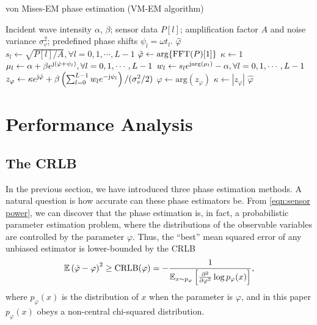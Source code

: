 \documentclass[12pt,draftclsnofoot,journal,onecolumn]{IEEEtran}
\theoremstyle{nonumberplain}
\def \arg {\text{arg}}
\begin{document}
    \begin{algorithm}[htbp] 
        \caption{von Mises-EM phase estimation (VM-EM algorithm)} \label{alg:VM-EM}
        \begin{algorithmic}[1]
            \REQUIRE Incident wave intensity $\alpha$, $\beta$; sensor data $P[l]$; amplification factor $A$ and noise variance $\sigma_v^2$; predefined phase shifts $\psi_l=\omega t_l$.
            \ENSURE $\hat{\varphi}$
            \STATE $s_l \leftarrow \sqrt{P[l]/A}, \forall l=0,1,\cdots,L-1$
            \STATE $\hat{\varphi} \leftarrow \arg\{{\rm FFT}(P)[1]\}$
            \STATE $\kappa \leftarrow 1$
                \STATE $\mu_l \leftarrow \alpha + \beta e^{{\rm j} (\hat{\varphi}+\psi_l)}, \forall l=0,1,\cdots,L-1$
                \STATE $w_l \leftarrow s_l e^{{\rm j} \arg(\mu_l)} - \alpha, \forall l=0,1,\cdots,L-1$
                \STATE $z_\varphi \leftarrow \kappa e^{{\rm j} \hat{\varphi}} + \beta \left( \sum_{l=0}^{L-1}{w_l e^{-{\rm j} \psi_l}}\right) / (\sigma_v^2/2)$
                \STATE $\hat{\varphi} \leftarrow \arg(z_\varphi)$
                \STATE $\kappa \leftarrow |z_\varphi|$
            \ENDWHILE
            \RETURN $\hat{\varphi}$
        \end{algorithmic}
    \end{algorithm}
    
\section{Performance Analysis}
\label{Performance Analysis}
\subsection{The CRLB}
    In the previous section, we have introduced three phase estimation methods. 
    A natural question is how accurate can these phase estimators be. 
    From \eqref{eqn:sensor power}, we can discover that the phase estimation is, in fact, a probabilistic parameter estimation problem, where the distributions of the observable variables are controlled by the parameter $\varphi$. 
    Thus, the ``best'' mean squared error of any unbiased estimator is lower-bounded by the CRLB \cite{casella2021statistical} 
    \begin{equation}
        \mathbb{E}\left(\hat{\varphi}-\varphi\right)^2 \geq {\rm CRLB}(\varphi) = -\frac{1}{\mathbb{E}_{x\sim p_\varphi}\left[\frac{\partial^2}{\partial\varphi^2}\log p_{\varphi}(x)\right]},
        \label{eqn:CRLB definition}
    \end{equation}
    where $p_{\varphi}(x)$ is the distribution of $x$ when the parameter is $\varphi$, and in this paper $p_{\varphi}(x)$ obeys a non-central chi-squared distribution. 
\end{document}
